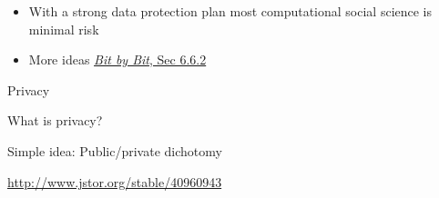 \documentclass{beamer}
\def\vf{\vfill}
\begin{document}
\begin{frame}

\begin{itemize}
\item With a strong data protection plan most computational social science is minimal risk
\pause
\item More ideas \href{https://www.bitbybitbook.com/en/1st-ed/ethics/dilemmas/info-risk/}{\textit{Bit by Bit}, Sec 6.6.2}
\end{itemize}

\end{frame}
\begin{frame}

\begin{center}
\Large{Privacy}
\end{center}

\end{frame}
\begin{frame}

What is privacy?

\end{frame}
\begin{frame}

Simple idea: Public/private dichotomy

\end{frame}
\begin{frame}

\begin{center}
\end{center}

\vf
\tiny{\url{http://www.jstor.org/stable/40960943}}

\end{frame}
\end{document}
